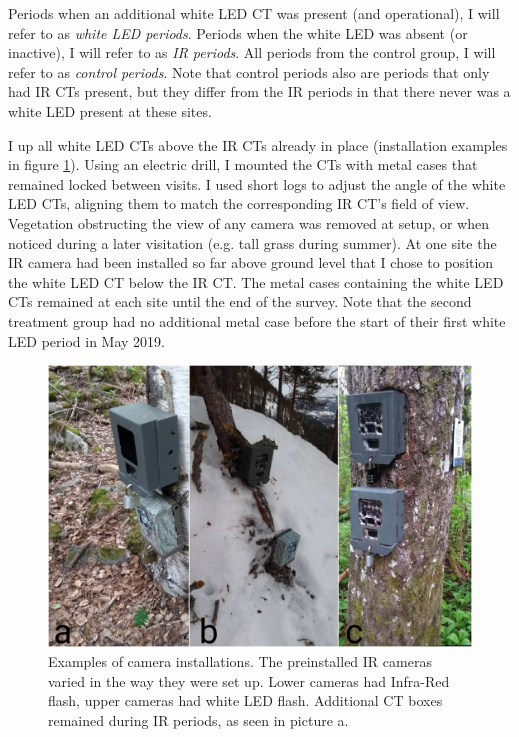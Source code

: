 Periods when an additional white LED CT was present (and operational), I will refer to as \emph{white LED periods}.
Periods when the white LED was absent (or inactive), I will refer to as \emph{IR periods}.
All periods from the control group, I will refer to as \emph{control periods}.
Note that control periods also are periods that only had IR CTs present, but they differ from the IR periods in that there never was a white LED present at these sites.

I up all white LED CTs above the IR CTs already in place (installation examples in figure \ref{fig:cam_ex_main}).
Using an electric drill, I mounted the CTs with metal cases that remained locked between visits.
I used short logs to adjust the angle of the white LED CTs, aligning them to match the corresponding IR CT's field of view.
Vegetation obstructing the view of any camera was removed at setup, or when noticed during a later visitation (e.g. tall grass during summer).
At one site the IR camera had been installed so far above ground level that I chose to position the white LED CT below the IR CT. %
The metal cases containing the white LED CTs remained at each site until the end of the survey. Note that the second treatment group had no additional metal case before the start of their first white LED period in May 2019.


\begin{figure}
			\centering
			\includegraphics[width=\textwidth]{./img/cam_example/install_ex4.jpg}
			\caption[Examples of camera installations]
	{Examples of camera installations.  \small %
		The preinstalled IR cameras varied in the way they were set up. Lower cameras had Infra-Red flash, upper cameras had white LED flash. Additional CT boxes remained during IR periods, as seen in picture a.}
	\label{fig:cam_ex_main}
\end{figure}



